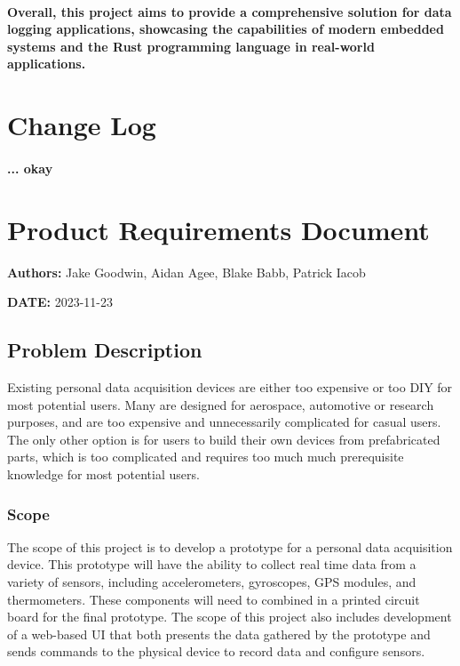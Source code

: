 \documentclass{article}
\begin{document}
\paragraph{
Overall, this project aims to provide a comprehensive solution for data logging
applications, showcasing the capabilities of modern embedded systems and the
Rust programming language in real-world applications.
}


\section{Change Log}
\paragraph{
...
okay
}


\newpage


\section{Product Requirements Document}

\textbf{Authors:} Jake Goodwin, Aidan Agee, Blake Babb, Patrick Iacob

\textbf{DATE:} 2023-11-23


\subsection{Problem Description}
\label{problem-description}

Existing personal data acquisition devices are either too expensive or
too DIY for most potential users. Many are designed for aerospace,
automotive or research purposes, and are too expensive and unnecessarily
complicated for casual users. The only other option is for users to
build their own devices from prefabricated parts, which is too
complicated and requires too much much prerequisite knowledge for most
potential users.


\subsubsection{Scope}
\label{scope}

The scope of this project is to develop a prototype for a personal data
acquisition device. This prototype will have the ability to collect real
time data from a variety of sensors, including accelerometers,
gyroscopes, GPS modules, and thermometers. These components will need to
combined in a printed circuit board for the final prototype. The scope
of this project also includes development of a web-based UI that both
presents the data gathered by the prototype and sends commands to the
physical device to record data and configure sensors.
\end{document}
